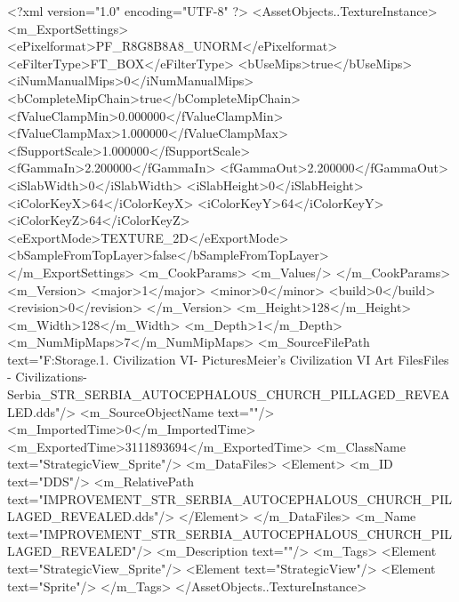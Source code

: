 <?xml version="1.0" encoding="UTF-8" ?>
<AssetObjects..TextureInstance>
	<m_ExportSettings>
		<ePixelformat>PF_R8G8B8A8_UNORM</ePixelformat>
		<eFilterType>FT_BOX</eFilterType>
		<bUseMips>true</bUseMips>
		<iNumManualMips>0</iNumManualMips>
		<bCompleteMipChain>true</bCompleteMipChain>
		<fValueClampMin>0.000000</fValueClampMin>
		<fValueClampMax>1.000000</fValueClampMax>
		<fSupportScale>1.000000</fSupportScale>
		<fGammaIn>2.200000</fGammaIn>
		<fGammaOut>2.200000</fGammaOut>
		<iSlabWidth>0</iSlabWidth>
		<iSlabHeight>0</iSlabHeight>
		<iColorKeyX>64</iColorKeyX>
		<iColorKeyY>64</iColorKeyY>
		<iColorKeyZ>64</iColorKeyZ>
		<eExportMode>TEXTURE_2D</eExportMode>
		<bSampleFromTopLayer>false</bSampleFromTopLayer>
	</m_ExportSettings>
	<m_CookParams>
		<m_Values/>
	</m_CookParams>
	<m_Version>
		<major>1</major>
		<minor>0</minor>
		<build>0</build>
		<revision>0</revision>
	</m_Version>
	<m_Height>128</m_Height>
	<m_Width>128</m_Width>
	<m_Depth>1</m_Depth>
	<m_NumMipMaps>7</m_NumMipMaps>
	<m_SourceFilePath text="F:\Mod Storage\2.1. Civilization VI\Mods\Archive - Pictures\Sid Meier's Civilization VI Art Files\Art Files - Civilizations\Civilization - Serbia\IMPROVEMENT_STR_SERBIA_AUTOCEPHALOUS_CHURCH_PILLAGED_REVEALED.dds"/>
	<m_SourceObjectName text=""/>
	<m_ImportedTime>0</m_ImportedTime>
	<m_ExportedTime>3111893694</m_ExportedTime>
	<m_ClassName text="StrategicView_Sprite"/>
	<m_DataFiles>
		<Element>
			<m_ID text="DDS"/>
			<m_RelativePath text="IMPROVEMENT_STR_SERBIA_AUTOCEPHALOUS_CHURCH_PILLAGED_REVEALED.dds"/>
		</Element>
	</m_DataFiles>
	<m_Name text="IMPROVEMENT_STR_SERBIA_AUTOCEPHALOUS_CHURCH_PILLAGED_REVEALED"/>
	<m_Description text=""/>
	<m_Tags>
		<Element text="StrategicView_Sprite"/>
		<Element text="StrategicView"/>
		<Element text="Sprite"/>
	</m_Tags>
</AssetObjects..TextureInstance>

